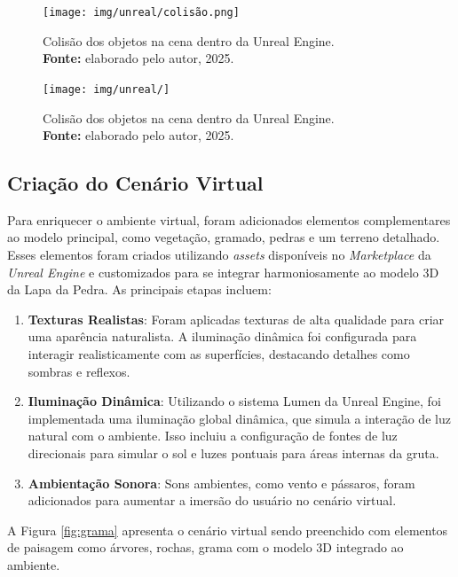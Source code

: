 \begin{figure}[H]
        \centering
        \texttt{[image: img/unreal/colisão.png]}
        \caption{Colisão dos objetos na cena dentro da Unreal Engine. \\
            \textbf{Fonte:} elaborado pelo autor, 2025.}
        \label{fig:colisao}
\end{figure}

\begin{figure}[H]
        \centering
        \texttt{[image: img/unreal/]}
        \caption{Colisão dos objetos na cena dentro da Unreal Engine. \\
            \textbf{Fonte:} elaborado pelo autor, 2025.}
        \label{fig:colisao}
\end{figure}

\subsection{Criação do Cenário Virtual}
Para enriquecer o ambiente virtual, foram adicionados elementos complementares ao modelo principal, como vegetação, gramado, pedras e um terreno detalhado. Esses elementos foram criados utilizando \textit{assets} disponíveis no \textit{Marketplace} da \textit{Unreal Engine} e customizados para se integrar harmoniosamente ao modelo 3D da Lapa da Pedra. As principais etapas incluem:
\begin{enumerate}
    \item \textbf{Texturas Realistas}: Foram aplicadas texturas de alta qualidade para criar uma aparência naturalista. A iluminação dinâmica foi configurada para interagir realisticamente com as superfícies, destacando detalhes como sombras e reflexos.
    \item \textbf{Iluminação Dinâmica}: Utilizando o sistema Lumen da Unreal Engine, foi implementada uma iluminação global dinâmica, que simula a interação de luz natural com o ambiente. Isso incluiu a configuração de fontes de luz direcionais para simular o sol e luzes pontuais para áreas internas da gruta.
    \item \textbf{Ambientação Sonora}: Sons ambientes, como vento e pássaros, foram adicionados para aumentar a imersão do usuário no cenário virtual.
\end{enumerate}
A Figura \ref{fig:grama} apresenta o cenário virtual sendo preenchido com elementos de paisagem como árvores, rochas, grama com o modelo 3D integrado ao ambiente.
